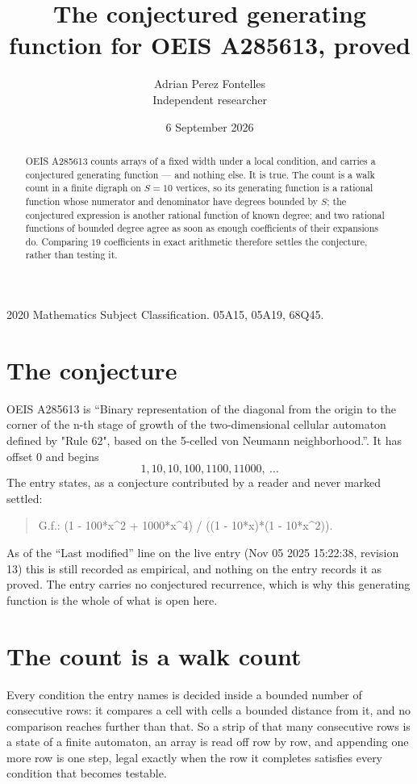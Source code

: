 \documentclass[11pt,a4paper]{article}
\title{The conjectured generating function for OEIS A285613, proved}
\author{Adrian Perez Fontelles\\ \small Independent researcher}
\date{6 September 2026}
\theoremstyle{plain}
\theoremstyle{definition}
\begin{document}
\maketitle

\begin{abstract}
OEIS A285613 counts arrays of a fixed width under a local condition, and carries a conjectured
generating function --- and nothing else. It is true. The count is a walk count in a finite
digraph on $S=10$ vertices, so its generating function is a rational function whose numerator
and denominator have degrees bounded by $S$; the conjectured expression is another rational
function of known degree; and two rational functions of bounded degree agree as soon as enough
coefficients of their expansions do. Comparing $19$ coefficients in exact arithmetic
therefore settles the conjecture, rather than testing it.
\end{abstract}

\noindent\small 2020 Mathematics Subject Classification. 05A15, 05A19, 68Q45.\normalsize

\section{The conjecture}

OEIS A285613 is ``Binary representation of the diagonal from the origin to the corner of the n-th stage of growth of the two-dimensional cellular automaton defined by "Rule 62", based on the 5-celled von Neumann neighborhood.''. It has offset $0$ and begins
\[
1, 10, 10, 100, 1100, 11000,\ \dots
\]
The entry states, as a conjecture contributed by a reader and never marked settled:
\begin{quote}
G.f.: (1 - 100*x\^{}2 + 1000*x\^{}4) / ((1 - 10*x)*(1 - 10*x\^{}2)).
\end{quote}
As of the ``Last modified'' line on the live entry (Nov 05 2025 15:22:38, revision 13) this is still
recorded as empirical, and nothing on the entry records it as proved. The entry carries no
conjectured recurrence, which is why this generating function is the whole of what is open
here.

\section{The count is a walk count}

Every condition the entry names is decided inside a bounded number of consecutive rows: it
compares a cell with cells a bounded distance from it, and no comparison reaches further than
that. So a strip of that many consecutive rows is a state of a finite automaton, an array is
read off row by row, and appending one more row is one step, legal exactly when the row it
completes satisfies every condition that becomes testable.
\end{document}
